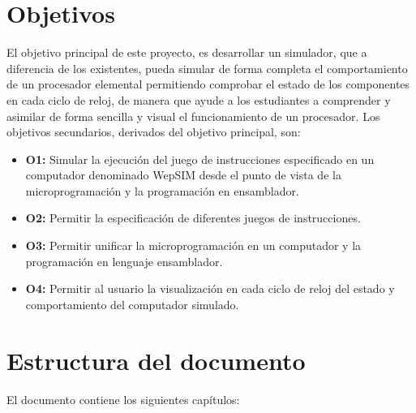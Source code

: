 \section{Objetivos}
\label{sec:objectives}

El objetivo principal de este proyecto, es desarrollar un simulador, que a diferencia de los existentes, pueda simular de forma completa el comportamiento de un procesador elemental permitiendo comprobar el estado de los componentes en cada ciclo de reloj, de manera que ayude a los estudiantes a comprender y asimilar de forma sencilla y visual el funcionamiento de un procesador. Los objetivos secundarios, derivados del objetivo principal, son:

\begin{itemize}

\item \textbf{O1:} Simular la ejecución del juego de instrucciones especificado en un computador denominado WepSIM desde el punto de vista de la microprogramación y la programación en ensamblador.

\item \textbf{O2:} Permitir la especificación de diferentes juegos de instrucciones.

\item \textbf{O3:} Permitir unificar la microprogramación en un computador y la programación en lenguaje ensamblador.

\item \textbf{O4:} Permitir al usuario la visualización en cada ciclo de reloj del estado y comportamiento del computador simulado.

\end{itemize}

\section{Estructura del documento}
\label{sec:document_structure}

El documento contiene los siguientes capítulos:

